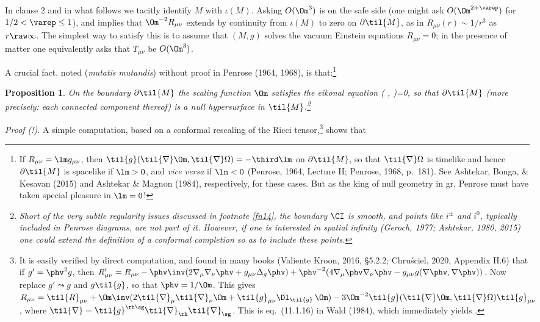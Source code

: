 \documentclass[11pt,a4paper]{article}
\newcommand{\n}{\nabla}
\newcommand{\p}{\partial}
\newcommand{\GR}{{\sc gr}}
\newtheorem{proposition}[theorem]{Proposition}
\begin{document}
In clause 2 and in what follows we tacitly identify $M$ with  $\iota(M)$. Asking $O(\Om^3)$  is
 on the safe side (one might ask $O(\Om^{2+\varep})$ for $1/2<\varep\leq 1$), and implies that $\Om^{-2} R_{\mu\nu}$ extends  by continuity from $\iota(M)$ to zero on $\p\til{M}$, as in $R_{\mu\nu}(r)\sim 1/r^3$ as $r\raw\infty$.
The simplest way to satisfy this  is to assume that $(M,g)$ solves the vacuum Einstein equations $R_{\mu\nu}=0$; in the presence of matter one equivalently asks that $T_{\mu\nu}$ be $O(\Om^3)$. 
 
 A crucial fact, noted (\emph{mutatis mutandis}) 
 without proof in Penrose (1964, 1968), is that:\footnote{If $R_{\mu\nu}=\lm g_{\mu\nu}$, then $\til{g}(\til{\nabla} \Om, \til{\nabla}\Omega)=-\third \lm$ on $\p\til{M}$, so that $\til{\nabla}\Omega$ is timelike and hence  $\p\til{M}$ is spacelike if $\lm>0$,  and \emph{vice versa} if $\lm<0$ (Penrose, 1964, Lecture II; Penrose, 1968, p.\ 181). See  Ashtekar,  Bonga, \& Kesavan (2015) and  Ashtekar \&  Magnon (1984), respectively, for these cases.
 But as the king of null geometry in \GR, Penrose must have taken special pleasure in $\lm=0$!
 }
 \begin{proposition}\label{Omeikonal}
On the boundary $\p\til{M}$ the scaling function $\Om$ satisfies the eikonal equation 
\beq
{}(\til{\nabla} \Om, \til{\nabla}\Omega)=0, \label{eikonaleq}
\eeq
so that $\p\til{M}$ (more precisely: each connected component thereof) is a null hypersurface in $\til{M}$.\footnote{ Short of the very subtle regularity issues discussed in footnote \ref{fn14},
 the boundary $\CI$ is smooth, and points like $i^{\pm}$ and $i^0$, typically included in Penrose diagrams, are \emph{not} part of it. However,  if one is interested in \emph{spatial} infinity (Geroch, 1977; Ashtekar, 1980, 2015) one could extend the definition of a conformal completion so as to include these points. } 
\end{proposition}
\emph{Proof (!)}. A simple computation, based on a conformal rescaling of the Ricci tensor,\footnote{It is easily verified by direct computation, and found in many books (Valiente Kroon, 2016, \S 5.2.2; Chru\'{s}ciel, 2020, Appendix H.6)
 that if $g'=\phv^2 g$, then $R'_{\mu\nu}=R_{\mu\nu}-\phv\inv(2\n_{\mu}\n_{\nu}\phv +g_{\mu\nu}\Delta_g \phv)+\phv^{-2}(4\n_{\mu}\phv \n_{\nu}\phv-
g_{\mu\nu}g(\n\phv,\n\phv))$.
 Now replace $g'\leadsto g$ and $g\leadsto\til{g}$, so that $\phv=1/\Om$. This gives 
$R_{\mu\nu}=\til{R}_{\mu\nu}+\Om\inv(2\til{\n}_{\mu}\til{\n}_{\nu}\Om+ \til{g}_{\mu\nu}\Dl_{\til{g}}\,\Om)-3\Om^{-2}\til{g}(\til{\nabla} \Om, \til{\nabla}\Omega)\til{g}_{\mu\nu}$, where  $\til{\nabla} = \til{g}^{\rh\sg}\til{\nabla}_{\rh}\til{\nabla}_{\sg}$. This is eq.\ (11.1.16) in Wald (1984), which immediately yields .} shows that
\end{document}
